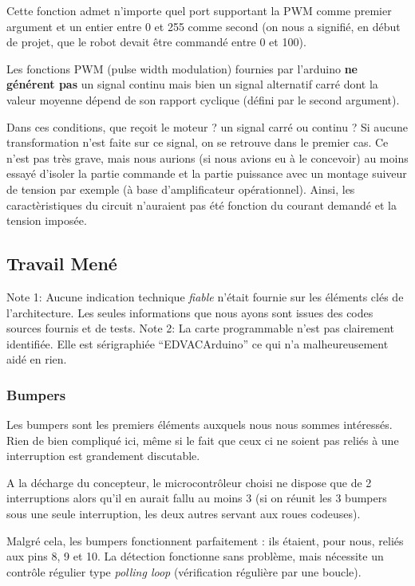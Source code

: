 \documentclass[a4paper]{report}
\begin{document}
Cette fonction admet n'importe quel port supportant la PWM comme premier argument et un entier entre 0 et 255 comme second (on nous a signifié, en début de projet, que le robot devait être commandé entre 0 et 100).

Les fonctions PWM (pulse width modulation) fournies par l'arduino \textbf{ne générent pas} un signal continu mais bien un signal alternatif carré dont la valeur moyenne dépend de son rapport cyclique (défini par le second argument).

Dans ces conditions, que reçoit le moteur ? un signal carré ou continu ?
Si aucune transformation n'est faite sur ce signal, on se retrouve dans le premier cas.
Ce n'est pas très grave, mais nous aurions (si nous avions eu à le concevoir) au moins essayé d'isoler la partie commande et la partie puissance avec un montage suiveur de tension par exemple (à base d'amplificateur opérationnel).
Ainsi, les caractèristiques du circuit n'auraient pas été fonction du courant demandé et la tension imposée.


\subsection{Travail Mené%
  \label{travail-mene}%
}

Note 1: Aucune indication technique \emph{fiable} n'était fournie sur les éléments clés de l'architecture. Les seules informations que nous ayons sont issues des codes sources fournis et de tests.
Note 2: La carte programmable n'est pas clairement identifiée. Elle est sérigraphiée ``EDVACArduino'' ce qui n'a malheureusement aidé en rien.


\subsubsection{Bumpers%
  \label{bumpers}%
}

Les bumpers sont les premiers éléments auxquels nous nous sommes intéressés.
Rien de bien compliqué ici, même si le fait que ceux ci ne soient pas reliés à une interruption est grandement discutable.

A la décharge du concepteur, le microcontrôleur choisi ne dispose que de 2 interruptions alors qu'il en aurait fallu au moins 3 (si on réunit les 3 bumpers sous une seule interruption, les deux autres servant aux roues codeuses).

Malgré cela, les bumpers fonctionnent parfaitement : ils étaient, pour nous, reliés aux pins 8, 9 et 10.
La détection fonctionne sans problème, mais nécessite un contrôle régulier type \emph{polling loop} (vérification régulière par une boucle).
\end{document}
